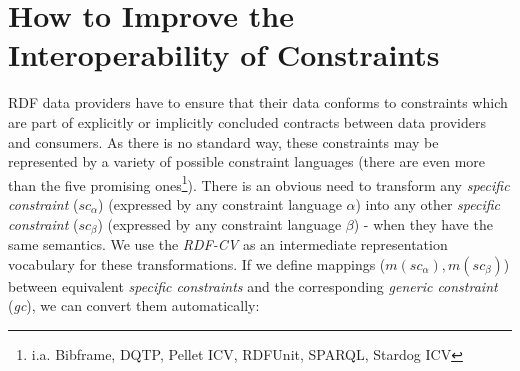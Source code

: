 \documentclass{llncs}
\newenvironment{DL}{
  \vspace{0cm}
	\begin{center}
  \begin{tabular}{r l}

}{
  \end{tabular}
	\end{center}
}
\begin{document}

%
%
%

\section{How to Improve the Interoperability of Constraints}
\label{sec:transformations}

RDF data providers have to ensure that their data conforms to constraints which are part of explicitly or implicitly concluded contracts between data providers and consumers.
As there is no standard way, these constraints may be represented by a variety of possible constraint languages (there are even more than the five promising ones\footnote{i.a. Bibframe, DQTP, Pellet ICV, RDFUnit, SPARQL, Stardog ICV}).
There is an obvious need to transform any \emph{specific constraint} (\emph{$sc_{\alpha}$}) (expressed by any constraint language \emph{$\alpha$}) into any other \emph{specific constraint} (\emph{$sc_{\beta}$}) (expressed by any constraint language \emph{$\beta$}) - when they have the same semantics.
We use the \emph{RDF-CV} as an intermediate representation vocabulary for these transformations.
If we define mappings ($m(sc_{\alpha}), m(sc_{\beta})$) between equivalent \emph{specific constraints} and the corresponding \emph{generic constraint} (\emph{gc}),
we can convert them automatically:
\end{document}
